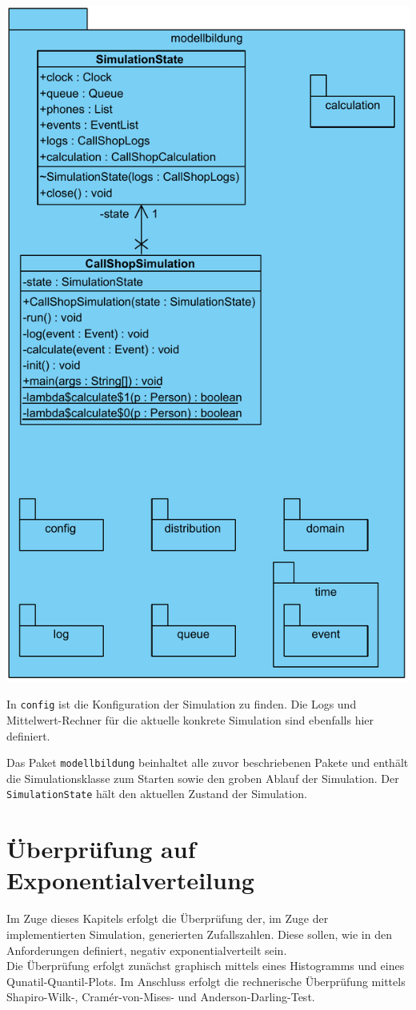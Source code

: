 \includegraphics[scale=0.5]{abbildungen/uml/modellbildung.pdf}

In \texttt{config} ist die Konfiguration der Simulation zu finden. Die Logs und Mittelwert-Rechner für die aktuelle konkrete Simulation sind ebenfalls hier definiert.

Das Paket \texttt{modellbildung} beinhaltet alle zuvor beschriebenen Pakete und enthält die Simulationsklasse zum Starten sowie den groben Ablauf der Simulation. Der \texttt{SimulationState} hält den aktuellen Zustand der Simulation.

\section{Überprüfung auf Exponentialverteilung}
Im Zuge dieses Kapitels erfolgt die Überprüfung der, im Zuge der implementierten Simulation, generierten Zufallszahlen. Diese sollen, wie in den Anforderungen definiert, negativ exponentialverteilt sein. \\
Die Überprüfung erfolgt zunächst graphisch mittels eines Histogramms und eines Qunatil-Quantil-Plots. Im Anschluss erfolgt die rechnerische Überprüfung mittels Shapiro-Wilk-, Cramér-von-Mises- und Anderson-Darling-Test.

